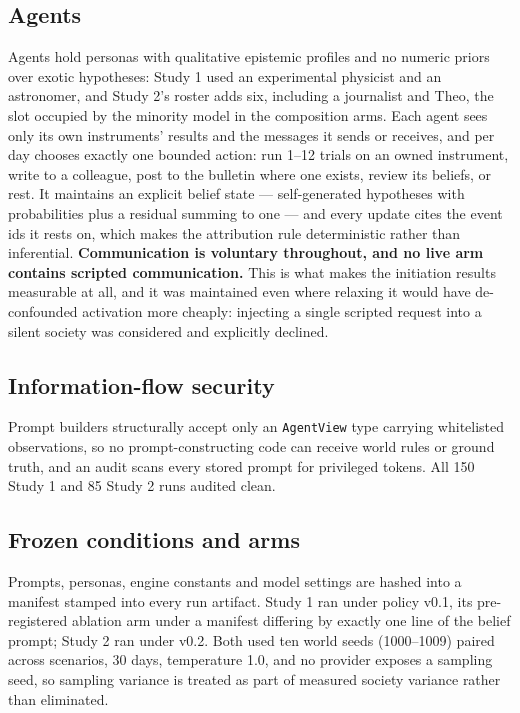 \documentclass[pdflatex,sn-basic]{sn-jnl}
\begin{document}
\hypertarget{agents}{%
\subsection{Agents}\label{agents}}

Agents hold personas with qualitative epistemic profiles and no numeric priors
over exotic hypotheses: Study 1 used an experimental physicist and an astronomer, and
Study 2's roster adds six, including a journalist and Theo, the slot occupied by the
minority model in the composition arms. Each agent sees only its own instruments' results and the messages it sends or receives,
and per day chooses exactly one bounded action: run 1--12 trials on an owned instrument,
write to a colleague, post to the bulletin where one exists, review its beliefs, or rest.
It maintains an explicit belief state --- self-generated hypotheses with probabilities plus
a residual summing to one --- and every update cites the event ids it rests on, which makes
the attribution rule deterministic rather than inferential.
\textbf{Communication is voluntary throughout, and no live arm contains scripted
communication.} This is what makes the initiation results measurable at all, and it was
maintained even where relaxing it would have de-confounded activation more cheaply:
injecting a single scripted request into a silent society was considered and explicitly
declined.

\hypertarget{information-flow-security}{%
\subsection{Information-flow security}\label{information-flow-security}}

Prompt builders structurally accept only an \texttt{AgentView}
type carrying whitelisted observations, so no prompt-constructing code can receive world
rules or ground truth, and an audit scans every stored prompt for privileged tokens. All
150 Study 1 and 85 Study 2 runs audited clean.

\hypertarget{frozen-conditions-and-arms}{%
\subsection{Frozen conditions and arms}\label{frozen-conditions-and-arms}}

Prompts, personas, engine constants and model settings are
hashed into a manifest stamped into every run artifact. Study 1 ran under policy v0.1, its
pre-registered ablation arm under a manifest differing by exactly one line of the belief
prompt; Study 2 ran under v0.2. Both used ten world seeds (1000--1009) paired across
scenarios, 30 days, temperature 1.0, and no provider exposes a sampling seed, so sampling
variance is treated as part of measured society variance rather than eliminated.
\end{document}
